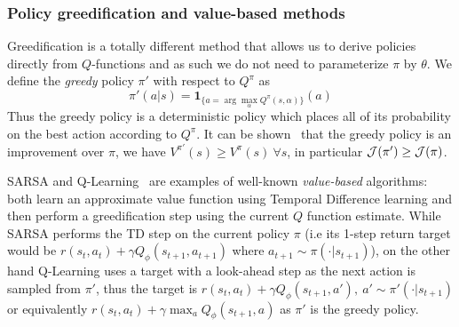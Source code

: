 \subsubsection{Policy greedification and value-based methods}
Greedification is a totally different method that allows us to derive policies directly from $Q$-functions and as such we do not need to parameterize $\pi$ by $\theta$.
We define the \emph{greedy} policy $\pi'$ with respect to $Q^\pi$ as
\begin{equation}
\label{eq:greedification}
    \pi'(a|s) = \mathbf{1}_{\{a=\arg \max_\alpha Q^\pi(s,\alpha)\} }(a)
\end{equation}
Thus the greedy policy is a deterministic policy which places all of its probability on the best action according to $Q^\pi$. It can be shown~\citep{sutton18book} that the greedy policy is an improvement over $\pi$, we have $V^{\pi'}(s) \ge V^\pi(s)\ \forall s$, in particular ${\mathcal{J}}(\pi') \ge {\mathcal{J}}(\pi)$.

SARSA and Q-Learning~\citep{watkins1992q} are examples of well-known \emph{value-based} algorithms: both learn an approximate value function using Temporal Difference learning and then perform a greedification step using the current $Q$ function estimate. While SARSA performs the TD step on the current policy $\pi$ (i.e its 1-step return target would be $r(s_t, a_t) + \gamma Q_\phi(s_{t+1}, a_{t+1})$ where $a_{t+1} \sim \pi(\cdot|s_{t+1})$), on the other hand Q-Learning uses a target with a look-ahead step as the next action is sampled from $\pi'$, thus the target is  $r(s_{t}, a_t) + \gamma Q_\phi(s_{t+1}, a'), \ a' \sim \pi'(\cdot|s_{t+1})$ or equivalently $r(s_t, a_t) + \gamma \max_a Q_\phi(s_{t+1}, a)$ as $\pi'$ is the greedy policy.



